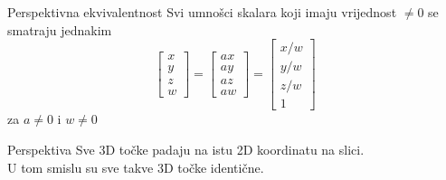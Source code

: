 \documentclass[9pt]{beamer}
\begin{document}
%	

\begin{frame}{Perspektivna ekvivalentnost}
	Svi umnošci skalara koji imaju vrijednost $\neq 0 $ se smatraju jednakim
	\begin{equation}
	\left[ \begin{array}{c}
	x \\ y \\ z\\ w\end{array} \right]  = 
	\left[ \begin{array}{c}
	ax \\ ay \\ az\\ aw\end{array} \right] = 
	\left[ \begin{array}{c}
	x/w \\ y/w \\ z/w\\ 1\end{array} \right] \nonumber
	\end{equation}
	za $ a\neq 0 $ i $ w\neq 0 $
	
	\begin{block}{Perspektiva}
		Sve 3D točke padaju na istu 2D koordinatu na slici.\\
		U tom smislu su sve takve 3D točke identične.
	\end{block}

\end{frame}

%	
\end{document}
